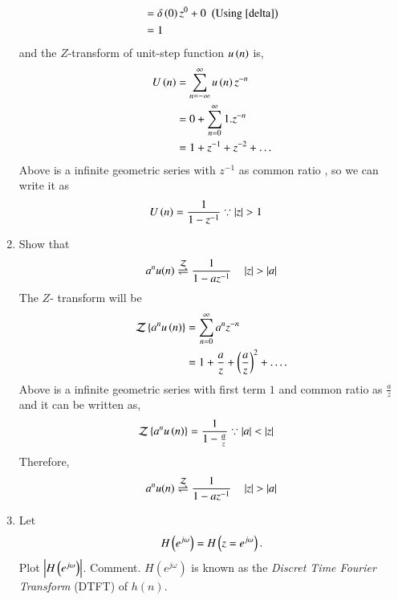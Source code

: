 \documentclass[journal,12pt,twocolumn]{IEEEtran}
\renewcommand\thesection{\arabic{section}}
\begin{document}
\begin{enumerate}[label=\thesection.\arabic*]
\begin{align}
                                       &= \delta\left(0\right)z^{0} + 0\,\, \left(\text{Using \eqref{delta}}\right)\\
                                       &= 1
      \end{align}
       and the $Z$-transform of unit-step function $u\left(n\right)$ is,
      \begin{align}
          U\left(n\right) &= \sum_{n=-\infty}^{\infty}u\left(n\right)z^{-n}\\
                    &= 0 + \sum_{n = 0}^{\infty}1.z^{-n}\\
                    &= 1 + z^{-1} + z^{-2} + .\,.\,.
      \end{align}
       Above is a infinite geometric series with $z^{-1}$ as common ratio , so we can write it as 
      \begin{align}
          U\left(n\right) &= \frac{1}{1-z^{-1}} \because \left\vert z\right\vert > 1
      \end{align} 
    \item Show that 
      \begin{equation}
        \label{eq:anun}
        a^nu(n) \overset{\mathcal{Z}}{ \rightleftharpoons} \frac{1}{1-az^{-1}} \quad \left\vert z\right\vert > \left\vert a\right\vert
      \end{equation}
    \solution
     The $Z$- transform will be 
      \begin{align}
              \mathcal{Z}\left\{a^nu\left(n\right)\right\} &= \sum_{n = 0}^{\infty}a^{n}z^{-n}\\
                                              &= 1 + \frac{a}{z} + \left(\frac{a}{z}\right)^2 + .\,.\,.\,.
      \end{align}
     Above is a infinite geometric series with first term $1$ and common ratio as $\frac{a}{z}$ and it can 
       be written as,
      \begin{align}
              \mathcal{Z}\left\{a^nu\left(n\right)\right\} &= \frac{1}{1 - \frac{a}{z}} \because \left\vert a\right\vert < \left\vert z\right\vert 
      \end{align}
     Therefore,
      \begin{equation}
          a^nu(n) \overset{\mathcal{Z}}{ \rightleftharpoons} \frac{1}{1-az^{-1}} \quad \left\vert z\right\vert > \left\vert a\right\vert
      \end{equation}
    \item 
      Let
      \begin{equation}
        H\left(e^{j \omega}\right) = H\left(z = e^{j \omega}\right).
      \end{equation}
      Plot $\left\vert H\left(e^{j \omega}\right)\right\vert$.  Comment.  $H(e^{j \omega})$ is known as the {\em Discret Time Fourier Transform} (DTFT) of $h(n)$.\\

\end{enumerate}
\end{document}
